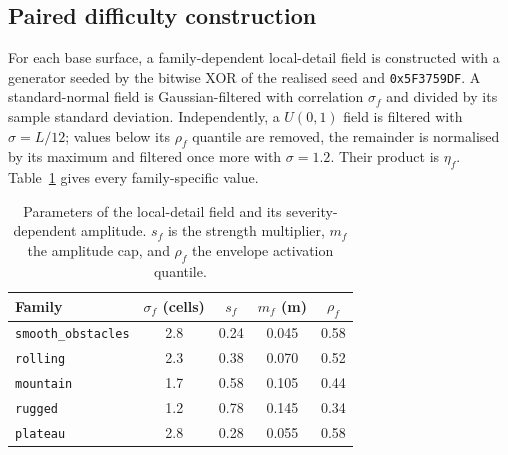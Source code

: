 \documentclass[11pt]{article}
\begin{document}
\subsection{Paired difficulty construction}

For each base surface, a family-dependent local-detail field is constructed
with a generator seeded by the bitwise XOR of the realised seed and
\texttt{0x5F3759DF}. A
standard-normal field is Gaussian-filtered with correlation $\sigma_f$ and
divided by its sample standard deviation. Independently, a $U(0,1)$ field is
filtered with $\sigma=L/12$; values below its $\rho_f$ quantile are removed,
the remainder is normalised by its maximum and filtered once more with
$\sigma=1.2$. Their product is $\eta_f$. Table~\ref{tab:detail-parameters}
gives every family-specific value.

\begin{table}[htbp]
  \centering
  \caption{Parameters of the local-detail field and its severity-dependent
  amplitude. $s_f$ is the strength multiplier, $m_f$ the amplitude cap, and
  $\rho_f$ the envelope activation quantile.}
  \label{tab:detail-parameters}
  \small
  \begin{tabular}{lcccc}
    \toprule
    Family & $\sigma_f$ (cells) & $s_f$ & $m_f$ (m) & $\rho_f$ \\
    \midrule
    \texttt{smooth\_obstacles} & 2.8 & 0.24 & 0.045 & 0.58 \\
    \texttt{rolling}           & 2.3 & 0.38 & 0.070 & 0.52 \\
    \texttt{mountain}          & 1.7 & 0.58 & 0.105 & 0.44 \\
    \texttt{rugged}            & 1.2 & 0.78 & 0.145 & 0.34 \\
    \texttt{plateau}           & 2.8 & 0.28 & 0.055 & 0.58 \\
    \bottomrule
  \end{tabular}
\end{table}
\end{document}
